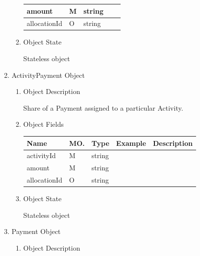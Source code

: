 \begin{enumerate}
\begin{enumerate}
\begin{center}
\begin{tabular}{|p{3cm}|l|p{3cm}|p{3cm}|p{4cm}|}
amount			& M & string				&							& 							\\
\hline

allocationId	& O & string				&							& 							\\
\hline


\end{tabular}
\end{center}

\item Object State

Stateless object

\end{enumerate}

\item ActivityPayment Object

\begin{enumerate}

\item Object Description

Share of a Payment assigned to a particular Activity.

\item Object Fields

\begin{center}
\begin{tabular}{|p{3cm}|l|p{3cm}|p{3cm}|p{4cm}|} 
\hline
\rowcolor{lightgray}	Name	& MO.	& Type	& Example & 	Description \\
\hline

activityId		& M & string				&							& 							\\
\hline

amount			& M & string				&							& 							\\
\hline

allocationId	& O & string				&							& 							\\
\hline


\end{tabular}
\end{center}

\item Object State

Stateless object

\end{enumerate}

\item Payment Object

\begin{enumerate}

\item Object Description


\end{enumerate}
\end{enumerate}
